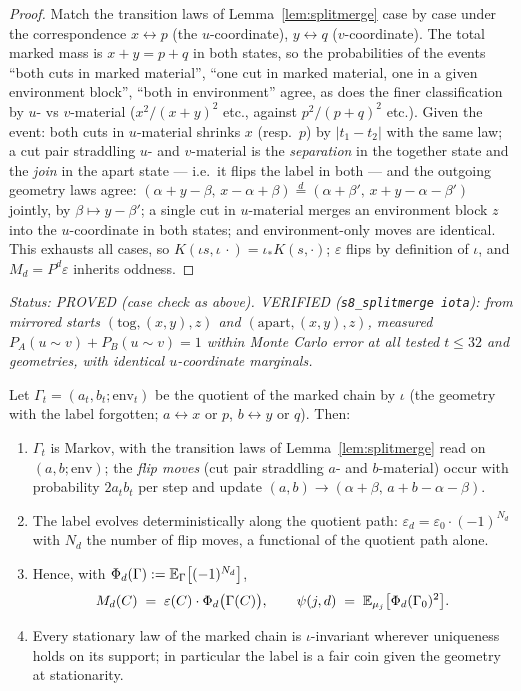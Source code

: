 \begin{proof}
Match the transition laws of Lemma~\ref{lem:splitmerge} case by case
under the correspondence $x\leftrightarrow p$ (the $u$-coordinate),
$y\leftrightarrow q$ ($v$-coordinate).  The total marked mass is
$x+y=p+q$ in both states, so the probabilities of the events ``both
cuts in marked material'', ``one cut in marked material, one in a
given environment block'', ``both in environment'' agree, as does the
finer classification by $u$- vs $v$-material ($x^2/(x{+}y)^2$ etc.,
against $p^2/(p{+}q)^2$ etc.).  Given the event: both cuts in
$u$-material shrinks $x$ (resp.\ $p$) by $|t_1-t_2|$ with the same
law; a cut pair straddling $u$- and $v$-material is the
\emph{separation} in the together state and the \emph{join} in the
apart state --- i.e.\ it flips the label in both --- and the outgoing
geometry laws agree:
$(\alpha+y-\beta,\,x-\alpha+\beta)
\overset{d}{=}(\alpha+\beta',\,x+y-\alpha-\beta')$ jointly, by
$\beta\mapsto y-\beta'$; a single cut in $u$-material merges an
environment block $z$ into the $u$-coordinate in both states; and
environment-only moves are identical.  This exhausts all cases, so
$K(\iota s,\iota\,\cdot)=\iota_*K(s,\cdot)$; $\varepsilon$ flips by
definition of $\iota$, and $M_d=P^d\varepsilon$ inherits oddness.
\end{proof}

\emph{Status: PROVED (case check as above).  VERIFIED
(\texttt{s8\_splitmerge iota}): from mirrored starts
$(\mathrm{tog},(x,y),z)$ and $(\mathrm{apart},(x,y),z)$, measured
$P_A(u\sim v)+P_B(u\sim v)=1$ within Monte Carlo error at all tested
$t\le32$ and geometries, with identical $u$-coordinate marginals.}

\begin{corollary}\label{cor:quotient}
Let $\Gamma_t=(a_t,b_t;\mathrm{env}_t)$ be the quotient of the marked
chain by $\iota$ (the geometry with the label forgotten;
$a\leftrightarrow x$ or $p$, $b\leftrightarrow y$ or $q$).  Then:
\begin{enumerate}[leftmargin=2em]
\item $\Gamma_t$ is Markov, with the transition laws of
Lemma~\ref{lem:splitmerge} read on $(a,b;\mathrm{env})$; the
\emph{flip moves} (cut pair straddling $a$- and $b$-material) occur
with probability $2a_tb_t$ per step and update
$(a,b)\to(\alpha+\beta,\,a+b-\alpha-\beta)$.
\item The label evolves deterministically along the quotient path:
$\varepsilon_d=\varepsilon_0\cdot(-1)^{N_d}$ with $N_d$ the number of
flip moves, a functional of the quotient path alone.
\item Hence, with
$\Phi_d(\Gamma):=\mathbb{E}_\Gamma\bigl[(-1)^{N_d}\bigr]$,
\[
M_d(C)\;=\;\varepsilon(C)\cdot\Phi_d\bigl(\Gamma(C)\bigr),
\qquad
\psi(j,d)\;=\;\mathbb{E}_{\mu_j}\bigl[\Phi_d(\Gamma_0)^2\bigr].
\]
\item Every stationary law of the marked chain is $\iota$-invariant
wherever uniqueness holds on its support; in particular the label is
a fair coin given the geometry at stationarity.
\end{enumerate}
\end{corollary}

